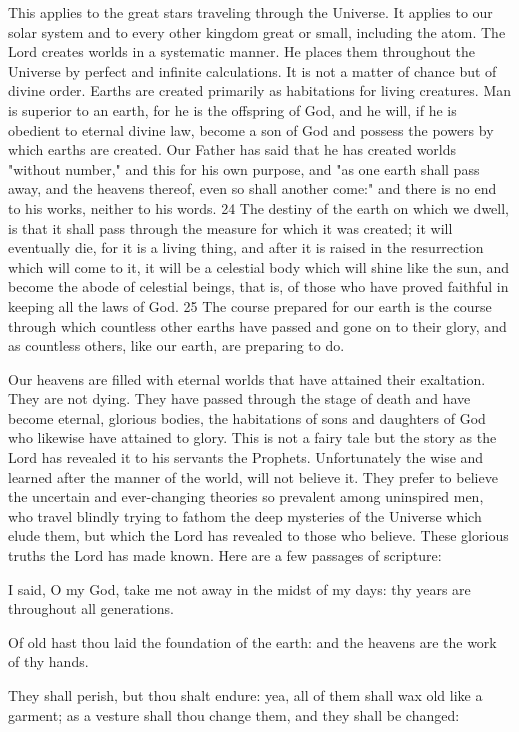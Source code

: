 This applies to the great stars traveling through the Universe. It applies to our solar system
and to every other kingdom great or small, including the atom. The Lord creates worlds in a
systematic manner. He places them throughout the Universe by perfect and infinite
calculations. It is not a matter of chance but of divine order. Earths are created primarily as
habitations for living creatures. Man is superior to an earth, for he is the offspring of God,
and he will, if he is obedient to eternal divine law, become a son of God and possess the
powers by which earths are created. Our Father has said that he has created worlds "without
number," and this for his own purpose, and "as one earth shall pass away, and the heavens
thereof, even so shall another come:" and there is no end to his works, neither to his words.
24 The destiny of the earth on which we dwell, is that it shall pass through the measure for
which it was created; it will eventually die, for it is a living thing, and after it is raised in the
resurrection which will come to it, it will be a celestial body which will shine like the sun,
and become the abode of celestial beings, that is, of those who have proved faithful in
keeping all the laws of God. 25 The course prepared for our earth is the course through which
countless other earths have passed and gone on to their glory, and as countless others, like
our earth, are preparing to do.

Our heavens are filled with eternal worlds that have attained their exaltation. They are not
dying. They have passed through the stage of death and have become eternal, glorious
bodies, the habitations of sons and daughters of God who likewise have attained to glory.
This is not a fairy tale but the story as the Lord has revealed it to his servants the Prophets.
Unfortunately the wise and learned after the manner of the world, will not believe it. They
prefer to believe the uncertain and ever-changing theories so prevalent among uninspired
men, who travel blindly trying to fathom the deep mysteries of the Universe which elude
them, but which the Lord has revealed to those who believe. These glorious truths the Lord
has made known. Here are a few passages of scripture:

I said, O my God, take me not away in the midst of my days: thy years are throughout all
generations.

Of old hast thou laid the foundation of the earth: and the heavens are the work of thy hands.

They shall perish, but thou shalt endure: yea, all of them shall wax old like a garment; as a
vesture shall thou change them, and they shall be changed:

